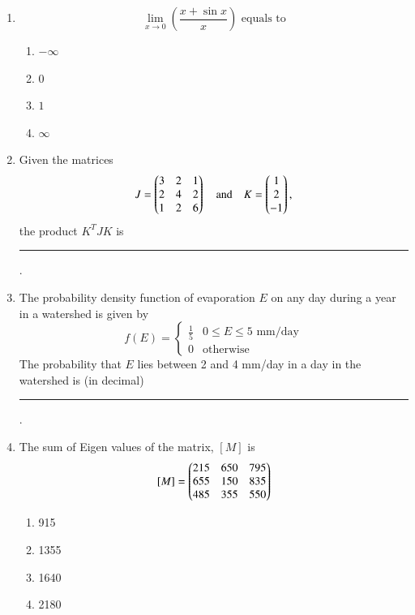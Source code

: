 \documentclass[journal,12pt,onecolumn]{IEEEtran}
\theoremstyle{remark}
\begin{document}
\newpage


\begin{enumerate}

\item 
\[
\lim_{x \to 0} \left(\frac{x + \sin x}{x}\right) \text{ equals to}
\]  \hfill{}

\begin{multicols}{4}
\begin{enumerate}
\item $-\infty$
\item $0$
\item $1$
\item $\infty$
\end{enumerate}
\end{multicols}
\item Given the matrices 
\[
J = \begin{pmatrix}3 & 2 & 1 \\ 2 & 4 & 2 \\ 1 & 2 & 6\end{pmatrix} \quad \text{and} \quad
K = \begin{pmatrix}1 \\ 2 \\ -1\end{pmatrix},
\]
the product $K^T J K$ is \rule{3cm}{0.15mm}. \hfill{}

\item The probability density function of evaporation $E$ on any day during a year in a watershed is given by \hfill{}
\[
f(E) = \begin{cases}
\frac{1}{5} & 0 \leq E \leq 5 \text{ mm/day}\\
0 & \text{otherwise}
\end{cases}
\]
The probability that $E$ lies between 2 and 4 mm/day in a day in the watershed is (in decimal) \rule{3cm}{0.15mm}.

\item The sum of Eigen values of the matrix, $[M]$ is \hfill{}
\[
[M] = \begin{pmatrix}215 & 650 & 795 \\ 655 & 150 & 835 \\ 485 & 355 & 550\end{pmatrix}
\]

\begin{multicols}{4}

\begin{enumerate}
\item 915
\item 1355
\item 1640
\item 2180
\end{enumerate}
\end{multicols}


\end{enumerate}
\end{document}
